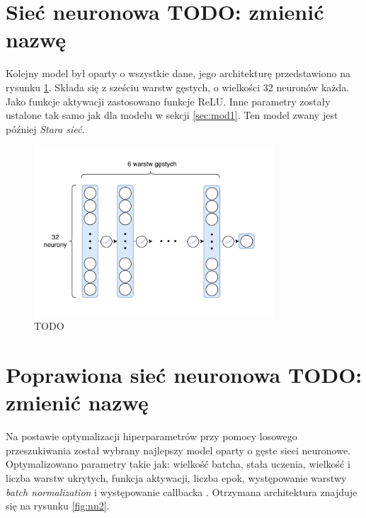 \documentclass{pracalicmgr}
\begin{document}
	\section{Sieć neuronowa TODO: zmienić nazwę}
	\label{sec:mod2}
	Kolejny model był oparty o wszystkie dane, jego architekturę przedstawiono na rysunku \ref{fig:nn1}. Składa się z sześciu warstw gęstych, o wielkości 32 neuronów każda. Jako funkcje aktywacji zastosowano funkcje ReLU. Inne parametry zostały ustalone tak samo jak dla modelu w sekcji \ref{sec:mod1}. Ten model zwany jest później \textit{Stara sieć}.
	\begin{figure}
	\centering
	\includegraphics[width=0.8\textwidth]{neural_net.pdf}
	\caption{TODO}
	\label{fig:nn1}
	\end{figure}
	
	\section{Poprawiona sieć neuronowa TODO: zmienić nazwę}
	Na postawie optymalizacji hiperparametrów przy pomocy losowego przeszukiwania został wybrany najlepszy model oparty o gęste sieci neuronowe. Optymalizowano parametry takie jak: wielkość batcha, stała uczenia, wielkość i liczba warstw ukrytych, funkcja aktywacji, liczba epok, występowanie warstwy \textit{batch normalization} i występowanie callbacka %
	. Otrzymana architektura znajduje się na rysunku \ref{fig:nn2}. 
	
\end{document}
